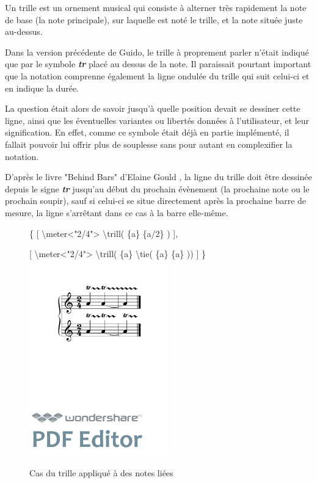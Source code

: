 \documentclass[a4paper,10pt,twocolumn]{article}
\newenvironment{code}
  {\fontfamily{pnc}\selectfont}{}
\begin{document}

Un trille est \og{}un ornement musical qui consiste à alterner très rapidement la note de base (la note principale), sur laquelle est noté le trille, et la note située juste au-dessus\fg{}.

Dans la version précédente de Guido, le trille à proprement parler n'était indiqué que par le symbole \textit{\textbf{tr}} placé au dessus de la note. Il paraissait pourtant important que la notation comprenne également la ligne ondulée du trille qui suit celui-ci et en indique la durée.

La question était alors de savoir jusqu'à quelle position devait se dessiner cette ligne, ainsi que les éventuelles variantes ou libertés données à l'utilisateur, et leur signification. En effet, comme ce symbole était déjà en partie implémenté, il fallait pouvoir lui offrir plus de souplesse sans pour autant en complexifier la notation.

D'après le livre "Behind Bars" d'Elaine Gould \cite{ref2}, la ligne du trille doit être dessinée depuis le signe \textit{\textbf{tr}} jusqu'au début du prochain évènement (la prochaine note ou le prochain soupir), sauf si celui-ci se situe directement après la prochaine barre de mesure, la ligne s'arrêtant dans ce cas à la barre elle-même. 

\begin{figure}[h]
\centering
\begin{code}
\{
[ \textbackslash{}meter\textless{}"2/4"\textgreater{} \textbackslash{}trill( \{a\} \{a/2\} ) ],

[ \textbackslash{}meter\textless{}"2/4"\textgreater{} \textbackslash{}trill( \{a\} \textbackslash{}tie( \{a\} \{a\} )) ]
\}
\end{code}
\includegraphics[width=6cm]{img/trill.pdf}
\caption{Cas du trille appliqué à des notes liées}
\label{fig:trill}
\end{figure}
\end{document}
